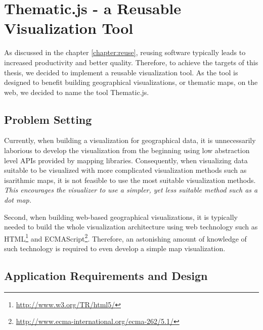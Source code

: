 
\chapter{Thematic.js - a Reusable Visualization Tool}
\label{chapter:implementation}




As discussed in the chapter \ref{chapter:reuse}, reusing software typically leads to increased productivity and better quality. Therefore, to achieve the targets of this thesis, we decided to implement a reusable visualization tool. As the tool is designed to benefit building geographical visualizations, or thematic maps, on the web, we decided to name the tool Thematic.js.

\section{Problem Setting}

Currently, when building a visualization for geographical data, it is unnecessarily laborious to develop the visualization from the beginning using low abstraction level APIs provided by mapping libraries. Consequently, when visualizing data suitable to be visualized with more complicated visualization methods such as isarithmic maps, it is not feasible to use the most suitable visualization methods. \emph{This encourages the visualizer to use a simpler, yet less suitable method such as a dot map.}

Second, when building web-based geographical visualizations, it is typically needed to build the whole visualization architecture using web technology such as HTML\footnote{\url{http://www.w3.org/TR/html5/}} and ECMAScript\footnote{\url{http://www.ecma-international.org/ecma-262/5.1/}}. Therefore, an astonishing amount of knowledge of such technology is required to even develop a simple map visualization. 

\section{Application Requirements and Design}
\label{section:requirements}

